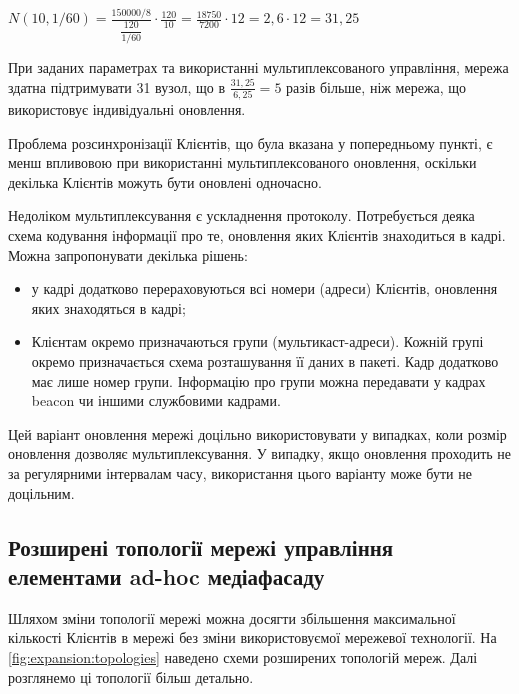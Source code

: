 \documentclass[a4paper,ukrainian,utf8,nocolumnsxix,floatsection,equationsection]{eskdtext}
\begin{document}
$N(10, 1/60) = \frac{150000 / 8}{\dfrac{120}{1/60}} \cdot \frac{120}{10} = 
		\frac{18750}{7200} \cdot 12 = 2,6 \cdot 12 = 31,25$


При заданих параметрах та використанні мультиплексованого управління, мережа здатна підтримувати 31 вузол, що в $\frac{31,25}{6,25} = 5$ разів більше, ніж мережа, що використовує індивідуальні оновлення. 

Проблема розсинхронізації Клієнтів, що була вказана у попередньому пункті, є менш впливовою при використанні мультиплексованого оновлення, оскільки декілька Клієнтів можуть бути оновлені одночасно.

Недоліком мультиплексування є ускладнення протоколу. Потребується деяка схема кодування інформації про те, оновлення яких Клієнтів знаходиться в кадрі. Можна запропонувати декілька рішень:

\begin{itemize}
	\item у кадрі додатково перераховуються всі номери (адреси) Клієнтів, оновлення яких знаходяться в кадрі;
	\item Клієнтам окремо призначаються групи (мультикаст-адреси). Кожній групі окремо призначається схема розташування її даних в пакеті. Кадр додатково має лише номер групи. Інформацію про групи можна передавати у кадрах beacon чи іншими службовими кадрами.
\end{itemize}

Цей варіант оновлення мережі доцільно використовувати у випадках, коли розмір оновлення дозволяє мультиплексування. У випадку, якщо оновлення проходить не за регулярними інтервалам часу, використання цього варіанту може бути не доцільним.

\subsection{Розширені топології мережі управління елементами ad-hoc медіафасаду}

Шляхом зміни топології мережі можна досягти збільшення максимальної кількості Клієнтів в мережі без зміни використовуємої мережевої технології. На \cref{fig:expansion:topologies} наведено схеми розширених топологій мереж. Далі розглянемо ці топології більш детально.
\end{document}
